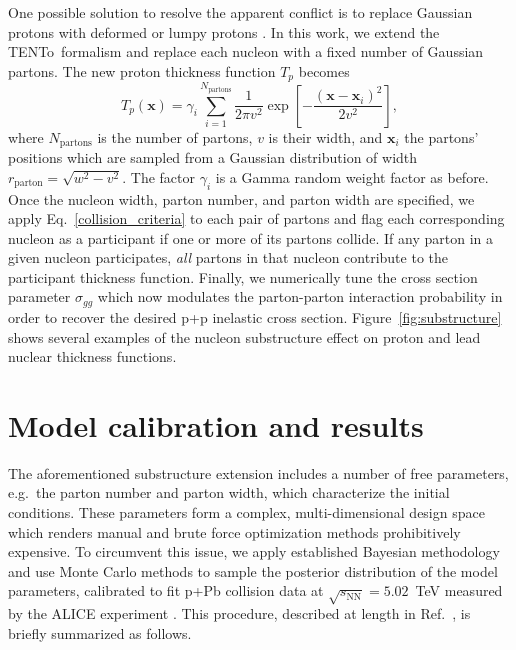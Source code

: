 \documentclass[3p,times,procedia]{elsarticle}
\newcommand{\trento}{T\raisebox{-0.3ex}{R}ENTo}
\begin{document}
One possible solution to resolve the apparent conflict is to replace Gaussian protons with deformed or lumpy protons \cite{Schenke:2014zha}.
In this work, we extend the \trento\ formalism and replace each nucleon with a fixed number of Gaussian partons.
The new proton thickness function $T_p$ becomes
\begin{equation}
  T_p(\mathbf{x}) = \gamma_i \sum\limits_{i=1}^{N_\mathrm{partons}} \frac{1}{2 \pi v^2} \exp\left[{-}\frac{(\mathbf{x} - \mathbf{x}_i)^2}{2 v^2}\right],
\end{equation}
where $N_\mathrm{partons}$ is the number of partons, $v$ is their width, and $\mathbf{x}_i$ the partons' positions which are sampled from a Gaussian distribution of width $r_\mathrm{parton} = \sqrt{w^2 - v^2}$.
The factor $\gamma_i$ is a Gamma random weight factor as before.
Once the nucleon width, parton number, and parton width are specified, we apply Eq.~\eqref{collision_criteria} to each pair of partons and flag each corresponding nucleon as a participant if one or more of its partons collide.
If any parton in a given nucleon participates, \emph{all} partons in that nucleon contribute to the participant thickness function.
Finally, we numerically tune the cross section parameter $\sigma_{gg}$ which now modulates the parton-parton interaction probability in order to recover the desired p+p inelastic cross section.
Figure~\ref{fig:substructure} shows several examples of the nucleon substructure effect on proton and lead nuclear thickness functions.

\section{Model calibration and results}

The aforementioned substructure extension includes a number of free parameters, e.g.\ the parton number and parton width, which characterize the initial conditions.
These parameters form a complex, multi-dimensional design space which renders manual and brute force optimization methods prohibitively expensive. 
To circumvent this issue, we apply established Bayesian methodology \cite{Higdon:2008cmc} and use Monte Carlo methods to sample the posterior distribution of the model parameters, calibrated to fit p+Pb collision data at $\sqrt{s_\mathrm{NN}} = 5.02$~TeV measured by the ALICE experiment \cite{Abelev:2014mda}.
This procedure, described at length in Ref.~\cite{Bernhard:2016tnd}, is briefly summarized as follows.
\end{document}
